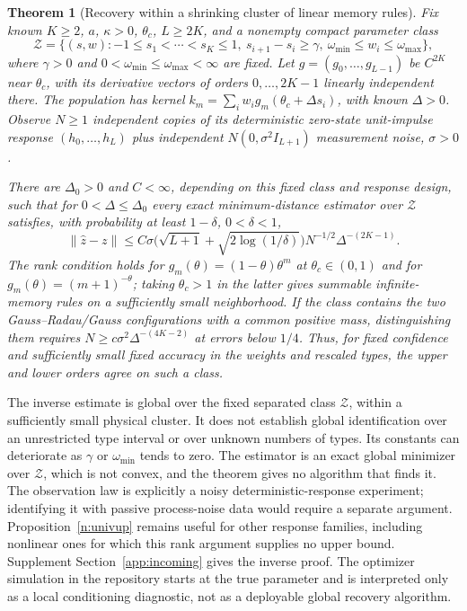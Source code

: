 \documentclass[12pt]{article}
\newtheorem{theorem}{Theorem}[section]
\theoremstyle{definition}
\theoremstyle{remark}
\begin{document}
\begin{theorem}[Recovery within a shrinking cluster of linear memory rules]\label{n:shape}
Fix known $K\ge2$, $a$, $\kappa>0$, $\theta_c$, $L\ge2K$, and a nonempty compact parameter class
\[
\mathcal Z=\{(s,w):-1\le s_1<\cdots<s_K\le1,\ s_{i+1}-s_i\ge\gamma,
\ \omega_{\min}\le w_i\le\omega_{\max}\},
\]
where $\gamma>0$ and $0<\omega_{\min}\le\omega_{\max}<\infty$ are fixed. Let $g=(g_0,\ldots,g_{L-1})$ be $C^{2K}$ near $\theta_c$, with its derivative vectors of orders $0,\ldots,2K-1$ linearly independent there. The population has kernel $k_m=\sum_iw_i g_m(\theta_c+\Delta s_i)$, with known $\Delta>0$. Observe $N\ge1$ independent copies of its deterministic zero-state unit-impulse response $(h_0,\ldots,h_L)$ plus independent $N(0,\sigma^2 I_{L+1})$ measurement noise, $\sigma>0$.

There are $\Delta_0>0$ and $C<\infty$, depending on this fixed class and response design, such that for $0<\Delta\le\Delta_0$ every exact minimum-distance estimator over $\mathcal Z$ satisfies, with probability at least $1-\delta$, $0<\delta<1$,
\[
\|\hat z-z\|\le C\sigma\big(\sqrt{L+1}+\sqrt{2\log(1/\delta)}\big)
N^{-1/2}\Delta^{-(2K-1)}.
\]
The rank condition holds for $g_m(\theta)=(1-\theta)\theta^m$ at $\theta_c\in(0,1)$ and for $g_m(\theta)=(m+1)^{-\theta}$; taking $\theta_c>1$ in the latter gives summable infinite-memory rules on a sufficiently small neighborhood.
If the class contains the two Gauss--Radau/Gauss configurations with a common positive mass, distinguishing them requires $N\ge c\sigma^2\Delta^{-(4K-2)}$ at errors below $1/4$. Thus, for fixed confidence and sufficiently small fixed accuracy in the weights and rescaled types, the upper and lower orders agree on such a class.
\end{theorem}

The inverse estimate is global over the fixed separated class $\mathcal Z$, within a sufficiently small physical cluster. It does not establish global identification over an unrestricted type interval or over unknown numbers of types. Its constants can deteriorate as $\gamma$ or $\omega_{\min}$ tends to zero. The estimator is an exact global minimizer over $\mathcal Z$, which is not convex, and the theorem gives no algorithm that finds it. The observation law is explicitly a noisy deterministic-response experiment; identifying it with passive process-noise data would require a separate argument. Proposition~\ref{n:univup} remains useful for other response families, including nonlinear ones for which this rank argument supplies no upper bound. Supplement Section~\ref{app:incoming} gives the inverse proof. The optimizer simulation in the repository starts at the true parameter and is interpreted only as a local conditioning diagnostic, not as a deployable global recovery algorithm.
\end{document}
